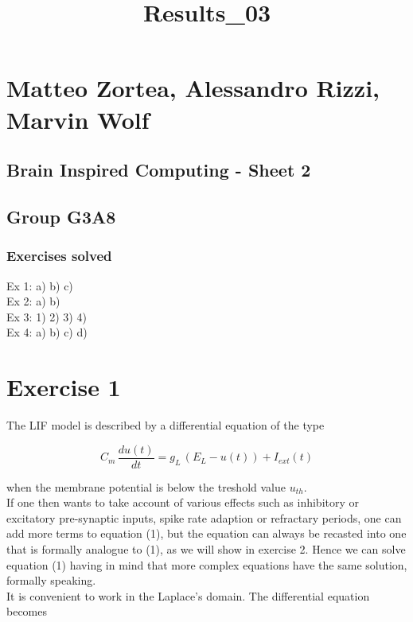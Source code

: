 \documentclass[11pt]{article}
\title{Results\_03}
\begin{document}
    
    \maketitle
    
    

    
    \section*{Matteo Zortea, Alessandro Rizzi, Marvin
Wolf}\label{matteo-zortea-alessandro-rizzi-and-marvin-wolf}

\subsection*{Brain Inspired Computing - Sheet
2}\label{brain-inspired-computing---sheet-2}

\subsection*{Group G3A8}\label{group-g3a8}

\subsubsection*{Exercises solved}\label{exercises-solved}

Ex 1: a) b) c)\\Ex 2: a) b)\\Ex 3: 1) 2) 3) 4)\\Ex 4: a) b) c) d)

    \section*{Exercise 1}\label{exercise-1}

The LIF model is described by a differential equation of the type

\begin{equation}
    C_m \, \frac{du(t)}{dt} = g_L \, \left(E_L - u(t)\right) + I_{ext}(t)
\end{equation}

when the membrane potential is below the treshold value $u_{th}$.\\If
one then wants to take account of various effects such as inhibitory or
excitatory pre-synaptic inputs, spike rate adaption or refractary
periods, one can add more terms to equation (1), but the equation can
always be recasted into one that is formally analogue to (1), as we will
show in exercise 2. Hence we can solve equation (1) having in mind that
more complex equations have the same solution, formally speaking.\\It is
convenient to work in the Laplace's domain. The differential equation
becomes
\end{document}
